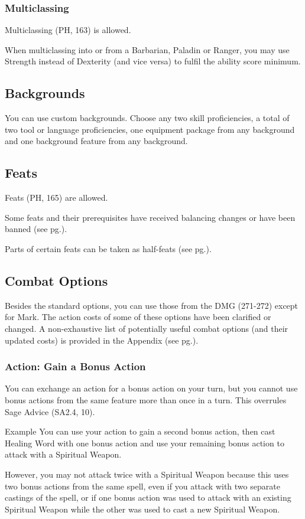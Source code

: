 \documentclass[letterpaper,twocolumn,openany,nodeprecatedcode]{dndbook}
\newcommand{\pg}[1]{pg.\pageref{#1}}
\begin{document}
\subsubsection{Multiclassing}
Multiclassing (PH, 163) is allowed. 

When multiclassing into or from a Barbarian, Paladin or Ranger, you may use Strength instead of Dexterity (and vice versa) to fulfil the ability score minimum. 

\subsection{Backgrounds}
You can use custom backgrounds. Choose any two skill proficiencies, a total of two tool or language proficiencies, one equipment package from any background and one background feature from any background.

\subsection{Feats}
Feats (PH, 165) are allowed. 

Some feats and their prerequisites have received balancing changes or have been banned (see \pg{balance-feats}).

Parts of certain feats can be taken as half-feats (see \pg{balance-feats-subfeats}).

\subsection{Combat Options}
Besides the standard options, you can use those from the DMG (271-272) except for Mark. The action costs of some of these options have been clarified or changed. A non-exhaustive list of potentially useful combat options (and their updated costs) is provided in the Appendix (see \pg{appendix-combat-options}). 

\label{gameplay-bonus-action}
\subsubsection{Action: Gain a Bonus Action}
You can exchange an action for a bonus action on your turn, but you cannot use bonus actions from the same feature more than once in a turn. This overrules Sage Advice (SA2.4, 10).

\begin{DndComment}{Example}
You can use your action to gain a second bonus action, then cast Healing Word with one bonus action and use your remaining bonus action to attack with a Spiritual Weapon. 

However, you may not attack twice with a Spiritual Weapon because this uses two bonus actions from the same spell, even if you attack with two separate castings of the spell, or if one bonus action was used to attack with an existing Spiritual Weapon while the other was used to cast a new Spiritual Weapon.
\end{DndComment}
\end{document}
